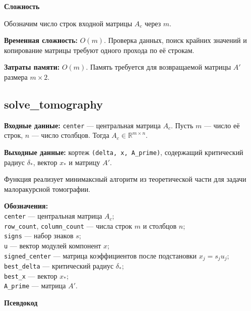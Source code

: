 \documentclass[12pt,a4paper]{article}
\numberwithin{equation}{section}
\newcommand{\theorypart}[1]{%
    \par\medskip
    \noindent\textbf{#1}\par\nopagebreak\smallskip
}
\begin{document}
\theorypart{Сложность}

\noindent
Обозначим число строк входной матрицы $A_c$ через $m$.

\smallskip
\noindent
\textbf{Временная сложность:} $O(m)$. Проверка данных, поиск крайних
значений и копирование матрицы требуют одного прохода по её строкам.

\smallskip
\noindent
\textbf{Затраты памяти:} $O(m)$. Память требуется для возвращаемой
матрицы $A'$ размера $m\times2$.

\subsection{solve\_tomography}

\noindent
\textbf{Входные данные:} \texttt{center} --- центральная матрица $A_c$.
Пусть $m$ --- число её строк, $n$ --- число столбцов. Тогда
$A_c\in\mathbb{R}^{m\times n}$.

\noindent
\textbf{Выходные данные:} кортеж \texttt{(delta, x, A\_prime)}, содержащий
критический радиус $\delta_*$, вектор $x_*$ и матрицу $A'$.

\medskip
\noindent
Функция реализует минимаксный алгоритм из теоретической части для задачи
малоракурсной томографии.

\smallskip
\noindent
\textbf{Обозначения:}\\
\texttt{center} --- центральная матрица $A_c$;\\
\texttt{row\_count}, \texttt{column\_count} --- числа строк $m$
и столбцов $n$;\\
\texttt{signs} --- набор знаков $s$;\\
\texttt{u} --- вектор модулей компонент $x$;\\
\texttt{signed\_center} --- матрица коэффициентов после подстановки
$x_j=s_ju_j$;\\
\texttt{best\_delta} --- критический радиус $\delta_*$;\\
\texttt{best\_x} --- вектор $x_*$;\\
\texttt{A\_prime} --- матрица $A'$.

\theorypart{Псевдокод}
\end{document}
